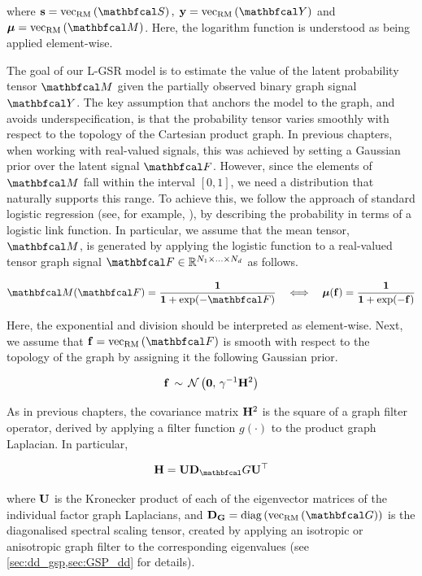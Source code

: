 where $\s = \vecrm{\St}, \; \y = \vecrm{\Yt}$ and $\muu = \vecrm{\Mt}$. Here, the logarithm function is understood as being applied element-wise.

The goal of our L-GSR model is to estimate the value of the latent probability tensor $\Mt$ given the partially observed binary graph signal $\Yt$. The key assumption that anchors the model to the graph, and avoids underspecification, is that the probability tensor varies smoothly with respect to the topology of the Cartesian product graph. In previous chapters, when working with real-valued signals, this was achieved by setting a Gaussian prior over the latent signal $\Ft$. However, since the elements of $\Mt$ fall within the interval $[0, 1]$, we need a distribution that naturally supports this range. To achieve this, we follow the approach of standard logistic regression (see, for example, \cite{Murphy2012}), by describing the probability in terms of a logistic link function. In particular, we assume that the mean tensor, $\Mt$, is generated by applying the logistic function to a real-valued tensor graph signal $\Ft \in \R^{N_1 \times ... \times N_d}$ as follows. 

\begin{equation}
    \label{eq:logistic_link}
    \Mt(\Ft) = \frac{\one}{\one + \exp(-\Ft)} \quad \Longleftrightarrow \quad \muu(\f) = \frac{\one}{\one + \exp(-\f)}
\end{equation}

Here, the exponential and division should be interpreted as element-wise. Next, we assume that $\f = \vecrm{\Ft}$ is smooth with respect to the topology of the graph by assigning it the following Gaussian prior. 

\begin{equation}
    \label{eq:f_prior_logit}
    \mathbf{f}  \, \sim \, \mathcal{N}\left( \mathbf{0}, \, \gamma^{-1} \mathbf{H}^2 \right) 
\end{equation}

As in previous chapters, the covariance matrix $\mathbf{H}^2$ is the square of a graph filter operator, derived by applying a filter function $g(\cdot)$ to the product graph Laplacian. In particular, 

\begin{equation*}
    \HH = \U \D_\Gt \U^\top
\end{equation*}

where $\mathbf{U}$ is the Kronecker product of each of the eigenvector matrices of the individual factor graph Laplacians, and $\D_\G = \diag{\vecrm{\Gt}}$ is the diagonalised spectral scaling tensor, created by applying an isotropic or anisotropic graph filter to the corresponding eigenvalues (see \cref{sec:dd_gsp,sec:GSP_dd} for details). 

